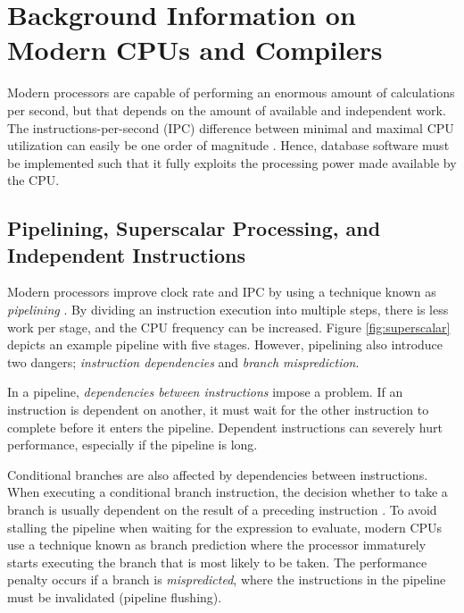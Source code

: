 \section{Background Information on Modern CPUs and Compilers}
\label{sec:Background Information on Modern CPUs and Compilers}
Modern processors are capable of performing an enormous amount of calculations per second, but that depends on the amount of available and independent work. The instructions-per-second (IPC) difference between minimal and maximal CPU utilization can easily be one order of magnitude \cite{Boncz2005-wj}. Hence, database software must be implemented such that it fully exploits the processing power made available by the CPU.

\subsection{Pipelining, Superscalar Processing, and Independent Instructions}
\label{sub:Pipelining, Superscalar Processing, and Independent Instructions}

Modern processors improve clock rate and IPC by using a technique known as \textit{pipelining} \cite{Boncz2005-wj}. By dividing an instruction execution into multiple steps, there is less work per stage, and the CPU frequency can be increased. Figure \ref{fig:superscalar} depicts an example pipeline with five stages. However, pipelining also introduce two dangers; \textit{instruction dependencies} and \textit{branch misprediction}.

In a pipeline, \textit{dependencies between instructions} impose a problem. If an instruction is dependent on another, it must wait for the other instruction to complete before it enters the pipeline. Dependent instructions can severely hurt performance, especially if the pipeline is long.

Conditional branches are also affected by dependencies between instructions. When executing a conditional branch instruction, the decision whether to take a branch is usually dependent on the result of a preceding instruction \cite{Boncz2005-wj}. To avoid stalling the pipeline when waiting for the expression to evaluate, modern CPUs use a technique known as branch prediction where the processor immaturely starts executing the branch that is most likely to be taken. The performance penalty occurs if a branch is \textit{mispredicted}, where the instructions in the pipeline must be invalidated (pipeline flushing).

